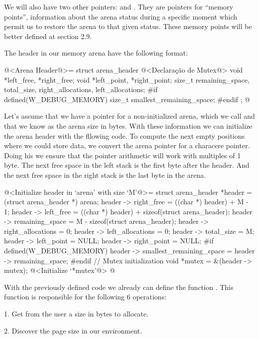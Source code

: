 We will also have two other pointers: 
and . They are pointers for ``memory
points'', information about the arena status during a specific moment
which permit us to restore the arena to that given status. These
memory points will be better defined at section 2.9.

The header in our memory arena have the following format:

\iniciocodigo
@<Arena Header@>=
struct arena_header{
  @<Declaração de Mutex@>
  void *left_free, *right_free;
  void *left_point, *right_point;
  size_t remaining_space, total_size, right_allocations, left_allocations;
#if defined(W_DEBUG_MEMORY)
  size_t smallest_remaining_space;
#endif
};
@
\fimcodigo

Let's assume that we have a pointer for a non-initialized arena, which
we call  and that we know as  the
arena size in bytes. With these information we can initialize the
arena header with the fllowing code. To compute the next empty
positions where we could store data, we convert the arena pointer for
a characere pointer. Doing his we ensure that the pointer arithmetic
will work with multiples of 1 byte. The next free space in the left
stack is the first byte after the header. And the next free space in
the right stack is the last byte in the arena.

\iniciocodigo
@<Initialize header in `arena' with size `M'@>=
{
  struct arena_header *header = (struct arena_header *) arena;
  header -> right_free = ((char *) header) + M - 1;
  header -> left_free = ((char *) header) + sizeof(struct arena_header);
  header -> remaining_space = M - sizeof(struct arena_header);
  header -> right_allocations = 0;
  header -> left_allocations = 0;
  header -> total_size = M;
  header -> left_point = NULL;
  header -> right_point = NULL;
#if defined(W_DEBUG_MEMORY)
  header ->  smallest_remaining_space = header -> remaining_space;
#endif
  { // Mutex initialization
    void *mutex = &(header -> mutex);
    @<Initialize `*mutex'@>
  }
}
@
\fimcodigo


With the previously defined code we already can define the
function . This function is responsible for
the following 6 operations:

1. Get from the user a size  in bytes to allocate.

2. Discover the page size  in our environment.

